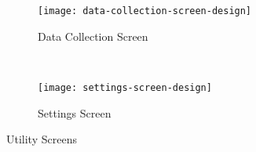 \begin{figure*}[ht]
    \centering
    \begin{subfigure}[t]{0.4\textwidth}
        \centering
        \texttt{[image: data-collection-screen-design]}
        \caption{Data Collection Screen}
        \label{fig:data-collection-screen-design}
    \end{subfigure}%
    ~ 
    \begin{subfigure}[t]{0.4\textwidth}
        \centering
        \texttt{[image: settings-screen-design]}
        \caption{Settings Screen}
    \end{subfigure}
    \caption{Utility Screens}
\end{figure*}